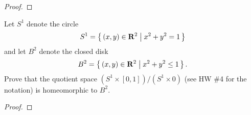 \newpage
\begin{problem}
\end{problem}
\begin{proof}
\end{proof}
\newpage
\begin{problem}[A]
Let $S^1$ denote the circle
\[
S^1=\left\{\,(x,y)\in\mathbf{R}^2\;\middle|\;x^2+y^2=1\,\right\}
\]
and let $B^2$ denote the closed disk
\[
B^2=\left\{\,(x,y)\in\mathbf{R}^2\;\middle|\;x^2+y^2\leq 1\,\right\}.
\]
Prove that the quotient space $(S^1\times[0,1])/(S^1\times 0)$
(see HW \#4 for the notation) is homeomorphic to $B^2$.
\end{problem}
\begin{proof}
\end{proof}

